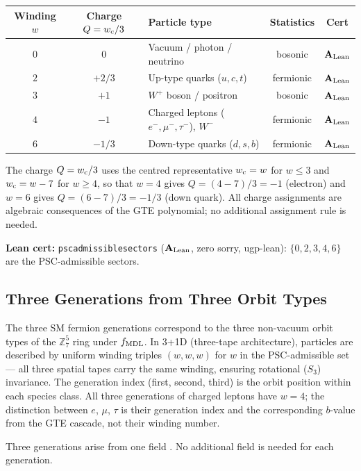 \documentclass[11pt,openany]{book}
\theoremstyle{remark}
\newcommand{\ZS}{\mathbb{Z}_7}
\newcommand{\lean}[1]{%
  \penalty-100
  \begingroup\def\_{\textunderscore\allowbreak}\texttt{#1}\endgroup}
\newcommand{\CatAL}{\ensuremath{\textbf{A}_{\rm Lean}}}
\begin{document}
\begin{center}
\begin{tabular}{@{}cclcc@{}}
\toprule
\textbf{Winding $w$} & \textbf{Charge $Q = w_{\rm c}/3$} & \textbf{Particle type} &
\textbf{Statistics} & \textbf{Cert} \\
\midrule
$0$ & $0$ & Vacuum / photon / neutrino & bosonic & \CatAL \\
$2$ & $+2/3$ & Up-type quarks ($u,c,t$) & fermionic & \CatAL \\
$3$ & $+1$ & $W^+$ boson / positron & bosonic & \CatAL \\
$4$ & $-1$ & Charged leptons ($e^-,\mu^-,\tau^-$), $W^-$ & fermionic & \CatAL \\
$6$ & $-1/3$ & Down-type quarks ($d,s,b$) & fermionic & \CatAL \\
\bottomrule
\end{tabular}
\end{center}

\noindent
The charge $Q = w_{\rm c}/3$ uses the centred representative
$w_{\rm c} = w$ for $w\leq 3$ and $w_{\rm c} = w-7$ for $w\geq 4$,
so that $w=4$ gives $Q = (4{-}7)/3 = -1$ (electron)
and $w=6$ gives $Q = (6{-}7)/3 = -1/3$ (down quark).
All charge assignments are algebraic consequences of the GTE polynomial;
no additional assignment rule is needed.

\textbf{Lean cert:} \lean{psc\_admissible\_sectors} (\CatAL, zero sorry, ugp-lean):
$\{0,2,3,4,6\}$ are the PSC-admissible sectors.

\subsection*{Three Generations from Three Orbit Types}

The three SM fermion generations correspond to the three non-vacuum orbit types
of the $\ZS^5$ ring under $f_{\rm MDL}$.
In 3+1D (three-tape architecture), particles are described by uniform winding triples
$(w,w,w)$ for $w$ in the PSC-admissible set --- all three spatial tapes carry the
same winding, ensuring rotational ($S_3$) invariance.
The generation index (first, second, third) is the orbit position within each
species class.
All three generations of charged leptons have $w=4$; the distinction between $e$, $\mu$,
$\tau$ is their generation index and the corresponding $b$-value from the GTE cascade,
not their winding number.

\noindent
Three generations arise from one field \cite{SpivackCMCA,SpivackThreeTapeCMCA}.
No additional field is needed for each generation.
\end{document}
